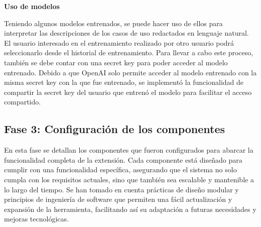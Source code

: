 \textbf{Uso de modelos}

Teniendo algunos modelos entrenados, se puede hacer uso de ellos para interpretar las descripciones de los casos de uso redactados en lenguaje natural. El usuario interesado en el entrenamiento realizado por otro usuario podrá seleccionarlo desde el historial de entrenamiento. Para llevar a cabo este proceso, también se debe contar con una secret key para poder acceder al modelo entrenado. Debido a que OpenAI solo permite acceder al modelo entrenado con la misma secret key con la que fue entrenado, se implementó la funcionalidad de compartir la secret key del usuario que entrenó el modelo para facilitar el acceso compartido.

\subsection{Fase 3: Configuración de los componentes}

En esta fase se detallan los componentes que fueron configurados para abarcar la funcionalidad completa de la extensión. Cada componente está diseñado para cumplir con una funcionalidad específica, asegurando que el sistema no solo cumpla con los requisitos actuales, sino que también sea escalable y mantenible a lo largo del tiempo. Se han tomado en cuenta prácticas de diseño modular y principios de ingeniería de software que permiten una fácil actualización y expansión de la herramienta, facilitando así su adaptación a futuras necesidades y mejoras tecnológicas.

